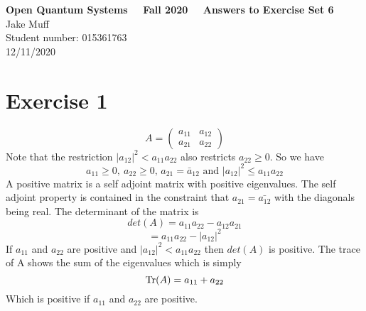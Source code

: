 \documentclass[12pt]{article}
\newcommand{\Tr}{{\rm Tr}}
\begin{document}
\normalsize

\baselineskip 14pt

\begin{center}
{\Large {\bf Open Quantum Systems \ \ Fall 2020 \ \  Answers to Exercise Set 6}}\\
{\large { Jake Muff}}\\
{Student number: 015361763}\\
{12/11/2020}
\end{center}



\section{Exercise 1}
\begin{equation}
     A = \begin{pmatrix}
     a_{11}&a_{12}\\ a_{21}&a_{22}
    \end{pmatrix}
    \end{equation}
Note that the restriction $|a_{12}|^2 < a_{11} a_{22}$ also restricts $a_{22} \geq 0$. So we have 
$$ a_{11}\geq 0,\ a_{22} \geq 0 ,\, a_{21}=\bar{a}_{12}\,\, \textrm{and} \,\, |a_{12}|^2\leq a_{11}a_{22} $$
 A positive matrix is a self adjoint matrix with positive eigenvalues. The self adjoint property is contained in the constraint that $a_{21} = \bar{a_{12}}$ with the diagonals being real. The determinant of the matrix is 
$$ det(A) = a_{11}a_{22} - a_{12}a_{21} $$
$$ = a_{11} a_{22} - |a_{12}|^2 $$
If $a_{11}$ and $a_{22}$ are positive and $|a_{12}|^2 < a_{11}a_{22}$ then $det(A)$ is positive. The trace of A shows the sum of the eigenvalues which is simply 
$$ \Tr (A) = a_{11} + a_{22} $$ 
Which is positive if $a_{11}$ and $a_{22} $ are positive. 
\end{document}

